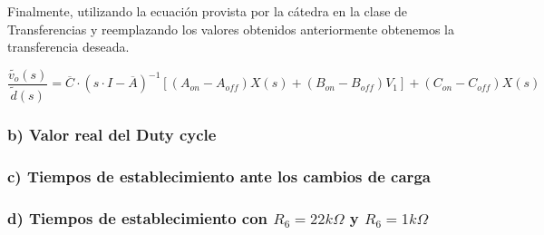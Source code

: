 \documentclass[e4_tp2_main.tex]{subfiles}
\begin{document}
Finalmente, utilizando la ecuaci\'on provista por la c\'atedra en la clase de Transferencias y reemplazando los valores obtenidos anteriormente obtenemos la transferencia deseada. 

\begin{equation}
\frac{ \widetilde{v_o}(s)}{\widetilde{d}(s)}= \overline{C} \cdot (s \cdot I - \overline{A})^{-1} \left[ (A_{on} - A_{off})X(s) + (B_{on} - B_{off}) V_1 \right] +(C_{on} - C_{off})X(s) 
\label{ec1.3}
\end{equation}


\subsubsection*{b) Valor real del Duty cycle}

\subsubsection*{c) Tiempos de establecimiento ante los cambios de carga }
\subsubsection*{d) Tiempos de establecimiento con $R_6=22k\Omega$ y $R_6=1k\Omega$}
\end{document}
